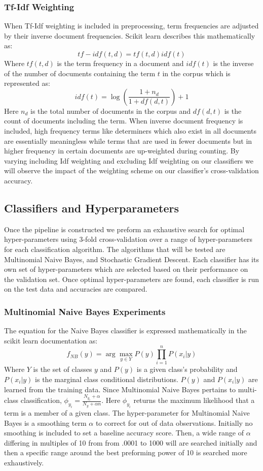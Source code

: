\documentclass[a4paper, 12pt]{article}
\begin{document}
\subsubsection{Tf-Idf Weighting}
When Tf-Idf weighting is included in preprocessing, term frequencies are adjusted by their inverse document frequencies. Scikit learn \cite{pedregosa2011scikit} describes this mathematically as: 
\[tf-idf(t,d)=tf(t,d)idf(t)\]
Where $tf(t,d)$ is the term frequency in a document and $idf(t)$ is the inverse of the number of documents containing the term $t$ in the corpus which is represented as:
\[idf(t)=\log(\frac{1+n_d}{1+df(d,t)}) +1\]
Here $n_d$ is the total number of documents in the corpus and $df(d,t)$ is the count of documents including the term. When inverse document frequency is included, high frequency terms like determiners which also exist in all documents are essentially meaningless while terms that are used in fewer documents but in higher frequency in certain documents are up-weighted during counting.  By varying including Idf weighting and excluding Idf weighting on our classifiers we will observe the impact of the weighting scheme on our classifier's cross-validation accuracy.
\subsection{Classifiers and Hyperparameters}
Once the pipeline is constructed we preform an exhaustive search for optimal hyper-parameters using 3-fold cross-validation over a range of hyper-parameters for each classification algorithm. The algorithms that will be tested are Multinomial Naive Bayes, and Stochastic Gradient Descent.  Each classifier has its own set of hyper-parameters which are selected based on their performance on the validation set. Once optimal hyper-parameters are found, each classifier is run on the test data and accuracies are compared.
\subsubsection{Multinomial Naive Bayes Experiments}
The equation for the Naive Bayes classifier is expressed mathematically in the scikit learn documentation \cite{pedregosa2011scikit} as: \[f_{NB}(y)=\arg\max_{y\in Y} P(y) \prod_{i=1}^{n} P(x_i|y)\]
Where $Y$ is the set of classes $y$ and $P(y)$ is a given class's probability and $P(x_i|y)$ is the marginal class conditional distributions.  $P(y)$ and $P(x_i|y)$ are learned from the training data. Since Multinomial Naive Bayes pertains to multi-class classification, $\phi_{y_i}=\frac{N_{y_i}+\alpha}{N_y +\alpha n}$. Here $\phi_{y_i}$  returns the maximum likelihood that a term is a member of a given class. The hyper-parameter for Multinomial Naive Bayes is a smoothing term $\alpha$ to correct for out of data observations.  Initially no smoothing is included to set a baseline accuracy score. Then, a wide range of $\alpha$ differing in multiples of 10 from from .0001 to 1000 will are searched initially and then a specific range around the best preforming power of 10 is searched more exhaustively.
\end{document}

